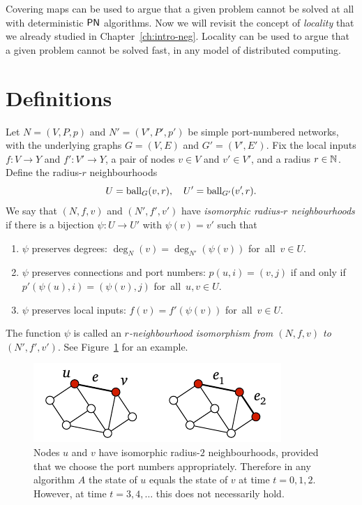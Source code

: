 
Covering maps can be used to argue that a given problem cannot be solved at all with deterministic $\textup{\sffamily PN}$ algorithms. Now we will revisit the concept of \emph{locality} that we already studied in Chapter~\ref{ch:intro-neg}. Locality can be used to argue that a given problem cannot be solved fast, in any model of distributed computing.

\section{Definitions}

Let $N = (V,P,p)$ and $N' = (V'\!,P'\!,p')$ be simple port-numbered networks, with the underlying graphs $G = (V,E)$ and $G' = (V'\!,E')$. Fix the local inputs $f\colon V \to Y$ and $f'\colon V' \to Y$, a pair of nodes $v \in V$ and $v' \in V'$, and a radius $r \in \mathbb{N}$. Define the radius-$r$ neighbourhoods
\[
    U = \operatorname{ball}_G(v,r), \quad U' = \operatorname{ball}_{G'}(v'\!,r).
\]
We say that $(N,f,v)$ and $(N'\!,f'\!,v')$ have \emph{isomorphic radius-$r$ neighbourhoods} if there is a bijection $\psi \colon U \to U'$ with $\psi(v) = v'$ such that
\begin{enumerate}\raggedright
    \item $\psi$ preserves degrees: $\deg_{N}(v) = \deg_{N'}(\psi(v))$ for~all~$v \in U$.
    \item $\psi$ preserves connections and port numbers: $p(u,i) = (v,j)$ if and only if $p'(\psi(u),i) = (\psi(v),j)$ for~all~$u, v \in U$.
    \item $\psi$ preserves local inputs: $f(v) = f'(\psi(v))$ for~all~$v \in U$.
\end{enumerate}
The function $\psi$ is called an \emph{$r$-neighbourhood isomorphism from $(N,f,v)$ to $(N'\!,f'\!,v')$}. See Figure~\ref{fig:same-neigh} for an example.

\begin{figure}
    \centering
    \includegraphics[page=\PSameNeigh]{figs.pdf}
    \caption{Nodes $u$ and $v$ have isomorphic radius-$2$ neighbourhoods, provided that we choose the port numbers appropriately. Therefore in any algorithm $A$ the state of $u$ equals the state of $v$ at time $t = 0,1,2$. However, at time $t = 3, 4, \dotsc$ this does not necessarily hold.}\label{fig:same-neigh}
\end{figure}

